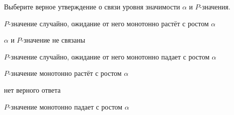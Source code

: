 
\begin{question}
Выберите верное утверждение о связи уровня значимости \(\alpha\) и
\(P\)-значения.
\begin{answerlist}
  \item \(P\)-значение случайно, ожидание от него монотонно растёт с ростом
\(\alpha\)
  \item \(\alpha\) и \(P\)-значение не связаны
  \item \(P\)-значение случайно, ожидание от него монотонно падает с ростом
\(\alpha\)
  \item \(P\)-значение монотонно растёт с ростом \(\alpha\)
  \item нет верного ответа
  \item \(P\)-значение монотонно падает с ростом \(\alpha\)
\end{answerlist}
\end{question}


